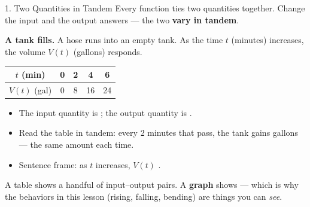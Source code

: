 \documentclass[10pt]{article}
\begin{document}
\boxguard[20]
\begin{notesbox}{1. Two Quantities in Tandem}
Every function ties two quantities together. Change the input and the output
answers --- the two \textbf{vary in tandem}.

\medskip
\textbf{A tank fills.} A hose runs into an empty tank. As the time $t$
(minutes) increases, the volume $V(t)$ (gallons) responds.

\smallskip
\renewcommand{\arraystretch}{1.4}
\begin{tabular}{|c|c|c|c|c|}
\hline
$t$ (min) & 0 & 2 & 4 & 6 \\
\hline
$V(t)$ (gal) & 0 & 8 & 16 & 24 \\
\hline
\end{tabular}
\smallskip

\begin{itemize}[itemsep=4pt]
  \item The input quantity is \blank{4.2cm}; the output quantity is
        \blank{4.2cm}.
  \item Read the table in tandem: every 2 minutes that pass, the tank gains
        \blank{1.4cm} gallons --- the same amount each time.
  \item Sentence frame: as $t$ increases, $V(t)$ \blank{7.4cm}.
\end{itemize}

\medskip
A table shows a handful of input--output pairs. A \textbf{graph} shows
\blank{4.6cm} --- which is why the behaviors in this lesson
(rising, falling, bending) are things you can \textit{see}.
\end{notesbox}

\vspace{0.1in}
\end{document}
